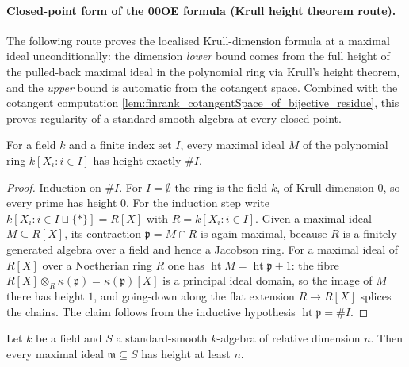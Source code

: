 \paragraph{Closed-point form of the 00OE formula (Krull height theorem route).}

The following route proves the localised Krull-dimension formula at a maximal
ideal unconditionally: the dimension \emph{lower} bound comes from the full
height of the pulled-back maximal ideal in the polynomial ring via Krull's
height theorem, and the \emph{upper} bound is automatic from the cotangent
space. Combined with the
cotangent computation \cref{lem:finrank_cotangentSpace_of_bijective_residue},
this proves regularity of a standard-smooth algebra at every closed point.

\begin{lemma}
  \label{lem:mvPolynomial_height_eq_natCard_of_isMaximal}
  For a field \(k\) and a finite index set \(I\), every maximal ideal \(M\) of
  the polynomial ring \(k[X_i : i \in I]\) has height exactly \(\#I\).
\end{lemma}

\begin{proof}
  Induction on \(\#I\). For \(I = \emptyset\) the ring is the field \(k\), of
  Krull dimension \(0\), so every prime has height \(0\). For the induction
  step write \(k[X_i : i \in I \sqcup \{\ast\}] = R[X]\) with
  \(R = k[X_i : i \in I]\). Given a maximal ideal \(M \subseteq R[X]\), its
  contraction \(\mathfrak p = M \cap R\) is again maximal, because \(R\) is a
  finitely generated algebra over a field and hence a Jacobson ring. For a
  maximal ideal of \(R[X]\) over a Noetherian ring \(R\) one has
  \(\operatorname{ht} M = \operatorname{ht} \mathfrak p + 1\): the fibre
  \(R[X] \otimes_R \kappa(\mathfrak p) = \kappa(\mathfrak p)[X]\) is a
  principal ideal domain, so the image of \(M\) there has height \(1\), and
  going-down along the flat extension \(R \to R[X]\) splices the chains. The
  claim follows from the inductive hypothesis
  \(\operatorname{ht}\mathfrak p = \#I\).
\end{proof}

\begin{lemma}
  \label{lem:standard_smooth_le_height_of_isMaximal}
  Let \(k\) be a field and \(S\) a standard-smooth \(k\)-algebra of relative
  dimension \(n\). Then every maximal ideal \(\mathfrak m \subseteq S\) has
  height at least \(n\).
\end{lemma}


